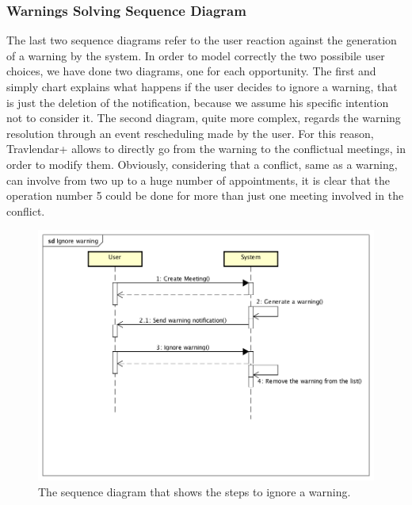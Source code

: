 \subsubsection{Warnings Solving Sequence Diagram}

The last two sequence diagrams refer to the user reaction against the generation of a warning by the system. 
In order to model correctly the two possibile user choices, we have done two diagrams, one for each opportunity. 
The first and simply chart explains what happens if the user decides to ignore a warning, that is just the deletion of the notification, because we assume his specific intention not to consider it. 
The second diagram, quite more complex, regards the warning resolution through an event rescheduling made by the user. For this reason, Travlendar+ allows to directly go from the warning to the conflictual meetings, in order to modify them. 
Obviously, considering that a conflict, same as a warning, can involve from two up to a huge number of appointments, it is clear that the operation number 5 could be done for more than just one meeting involved in the conflict. 

\begin{figure}[htp]
	\centering
	\includegraphics[width=\textwidth]{sequencediagrams/Ignorewarning}
	\caption{The sequence diagram that shows the steps to ignore a warning.}
	\label{fig:ignorewarning}
\end{figure}


